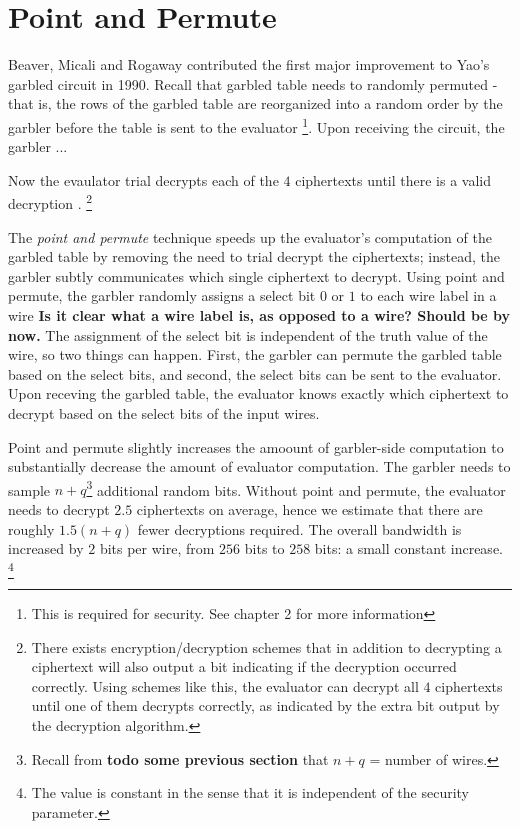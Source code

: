 \section{Point and Permute}

Beaver, Micali and Rogaway contributed the first major improvement to Yao's garbled circuit in 1990.
Recall that garbled table needs to randomly permuted - that is, the rows of the garbled table are reorganized into a random order by the garbler before the table is sent to the evaluator \footnote{This is required for security. See chapter 2 for more information}.
Upon receiving the circuit, the garbler  ...

Now the evaulator trial decrypts each of the $4$ ciphertexts until there is a valid decryption .
\footnote{There exists encryption/decryption schemes that in addition to decrypting a ciphertext will also output a bit indicating if the decryption occurred correctly. Using schemes like this, the evaluator can decrypt all $4$ ciphertexts until one of them decrypts correctly, as indicated by the extra bit output by the decryption algorithm.}

The \textit{point and permute} technique speeds up the evaluator's computation of the garbled table by removing the need to trial decrypt the ciphertexts; instead, the garbler subtly communicates which single ciphertext to decrypt.
Using point and permute, the garbler randomly assigns a select bit $0$ or $1$ to each wire label in a wire \textbf{Is it clear what a wire label is, as opposed to a wire? Should be by now.}
The assignment of the select bit is independent of the truth value of the wire, so two things can happen. 
First, the garbler can permute the garbled table based on the select bits, and second, the select bits can be sent to the evaluator.
Upon receving the garbled table, the evaluator knows exactly which ciphertext to decrypt based on the select bits of the input wires.

Point and permute slightly increases the amoount of garbler-side computation to substantially decrease the amount of evaluator computation.
The garbler needs to sample $n+q$\footnote{Recall from \textbf{todo some previous section} that $n+q$ = number of wires.} additional random bits.
Without point and permute, the evaluator needs to decrypt $2.5$ ciphertexts on average, hence we estimate that there are roughly $1.5(n+q)$ fewer decryptions required.
The overall bandwidth is increased by $2$ bits per wire, from $256$ bits to $258$ bits: a small constant increase. \footnote{The value is constant in the sense that it is independent of the security parameter.}

